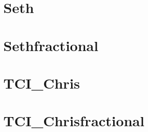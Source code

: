 \documentclass[letterpaper,10pt,english]{sphinxmanual}
\begin{document}
\chapter{Seth}
\label{\detokenize{Seth2021-09-30:seth}}\label{\detokenize{Seth2021-09-30::doc}}
\noindent{}


\chapter{Sethfractional}
\label{\detokenize{Sethfractional2021-09-30:sethfractional}}\label{\detokenize{Sethfractional2021-09-30::doc}}
\noindent{}


\chapter{TCI\_Chris}
\label{\detokenize{TCI_Chris2021-09-30:tci-chris}}\label{\detokenize{TCI_Chris2021-09-30::doc}}
\noindent{}


\chapter{TCI\_Chrisfractional}
\label{\detokenize{TCI_Chrisfractional2021-09-30:tci-chrisfractional}}\label{\detokenize{TCI_Chrisfractional2021-09-30::doc}}
\noindent{}



\renewcommand{\indexname}{Index}
\printindex
\end{document}
